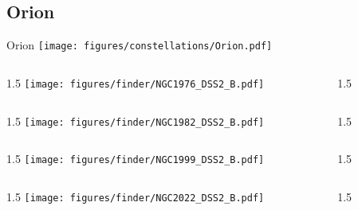 \documentclass[final]{beamer}
\newlength{\colwidth}
\begin{document}
\subsection{Orion}

\begin{frame}[t]{\LARGE Orion}
  \centering
  \texttt{[image: figures/constellations/Orion.pdf]}
\end{frame}


\begin{frame}[t]{}
  \begin{columns}[T]
    \begin{column}{1.5\colwidth}
      \centering
      \texttt{[image: figures/finder/NGC1976\_DSS2\_B.pdf]}
    \end{column}
    \begin{column}{1.5\colwidth}
      \Large
      
    \end{column}
  \end{columns}
  \vspace{\fill}
  \begin{columns}[T]
    \begin{column}{1.5\colwidth}
      \centering
      \texttt{[image: figures/finder/NGC1982\_DSS2\_B.pdf]}
    \end{column}
    \begin{column}{1.5\colwidth}
      \Large
      
    \end{column}
  \end{columns}
\end{frame}


\begin{frame}[t]{}
  \begin{columns}[T]
    \begin{column}{1.5\colwidth}
      \centering
      \texttt{[image: figures/finder/NGC1999\_DSS2\_B.pdf]}
    \end{column}
    \begin{column}{1.5\colwidth}
      \Large
      
    \end{column}
  \end{columns}
  \vspace{\fill}
  \begin{columns}[T]
    \begin{column}{1.5\colwidth}
      \centering
      \texttt{[image: figures/finder/NGC2022\_DSS2\_B.pdf]}
    \end{column}
    \begin{column}{1.5\colwidth}
      \Large
      
    \end{column}
  \end{columns}
\end{frame}
\end{document}
